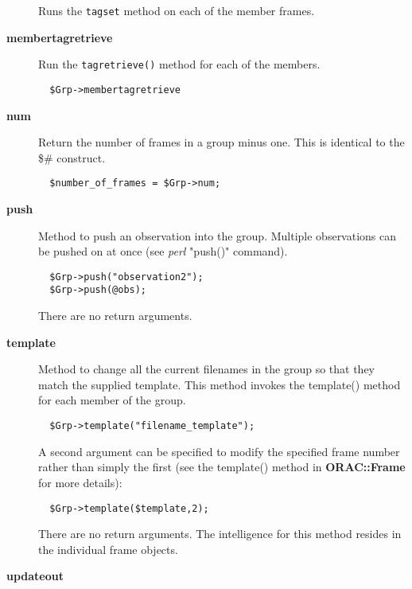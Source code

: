\begin{description}
Runs the \texttt{tagset} method on each of the member frames.


\item[\textbf{membertagretrieve}] \mbox{}

Run the \texttt{tagretrieve()} method for each of the members.

\begin{verbatim}
  $Grp->membertagretrieve
\end{verbatim}

\item[\textbf{num}] \mbox{}

Return the number of frames in a group minus one.
This is identical to the \$\# construct.

\begin{verbatim}
  $number_of_frames = $Grp->num;
\end{verbatim}

\item[\textbf{push}] \mbox{}

Method to push an observation into the group. Multiple observations
can be pushed on at once (see \emph{perl} "push()" command).

\begin{verbatim}
  $Grp->push("observation2");
  $Grp->push(@obs);
\end{verbatim}


There are no return arguments.


\item[\textbf{template}] \mbox{}

Method to change all the current filenames in the group so that they
match the supplied template. This method invokes the template()
method for each member of the group.

\begin{verbatim}
  $Grp->template("filename_template");
\end{verbatim}


A second argument can be specified to modify the specified frame
number rather than simply the first (see the template() method
in \textbf{ORAC::Frame} for more details):

\begin{verbatim}
  $Grp->template($template,2);
\end{verbatim}


There are no return arguments. The intelligence for this method resides
in the individual frame objects.


\item[\textbf{updateout}] \mbox{}


\end{description}

